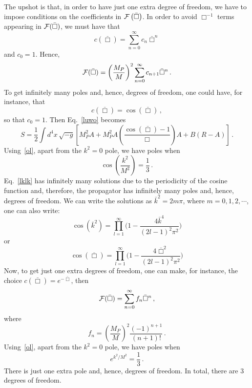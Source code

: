 \documentclass[a4paper,12pt]{article}
\newcommand{\bbox}{\bar{\Box}}
\newcommand{\be}{\begin{equation}}
\newcommand{\ee}{\end{equation}}
\newcommand{\cF}{{\cal F}}
\newcommand{\+}{^{\dagger}}
\newcommand{\LF}{\left(}
\newcommand{\RF}{\right)}
\newcommand{\LT}{\left[}
\newcommand{\RT}{\right]}
\newcommand{\2}{\frac{1}{2}}
\newcommand{\3}{\frac{1}{3}}
\newcommand{\4}{\frac{1}{4}}
\newcommand{\6}{\frac{1}{6}}
\newcommand{\8}{\frac{1}{8}}
\begin{document}
The upshot is that, in order to have just one extra degree of freedom, we have to impose conditions on the coefficients in $\cF \LF \bbox \RF$. In order to avoid $\Box^{-1}$ terms appearing in $\cF{(\bar{\Box})}$, we must have that
\be
c(\bar{\Box})=\sum_{n=0}^{\infty}c_{n}\bar{\Box}^{n} 
\ee
and $c_{0}=1$. Hence,
\be
\cF(\bar{\Box})=\LF \frac{M_{P}}{M} \RF^{2}\sum_{n=0}^{\infty}c_{n+1}\bar{\Box}^{n} \,.
\ee
To get infinitely many poles and, hence, degrees of freedom, one could have, for instance, that
\be
c(\bar{\Box})= \cos (\bar{\Box}) \,,
\ee
so that $c_{0}=1$. Then Eq.~\eqref{luwo} becomes
\be 
S=\frac{1}{2} \int d^{4}x \, \sqrt{-g} \LT M_{P}^{2}A +M_{P}^{2}A\left(\frac{\cos (\bar{\Box})-1}{\Box}\right)A +B(R-A)\RT \,.
\ee
Using~\eqref{ol}, apart from the $k^2=0$ pole,  we have poles when
\be \label{lklk}
\cos \left(\frac{k^{2}}{M^2}\right)=\frac{1}{3}\,.
\ee 
Eq.~\eqref{lklk} has infinitely many solutions due to the periodicity of the cosine function and, therefore, the propagator has infinitely many poles and, hence, degrees of freedom.
We can
write
the solutions as $\bar{k}^{2}=2m\pi$, where $m=0,1,2,\cdots$, one can also
write: 
\begin{equation}
\cos(\bar{k}^{2})=\prod^{\infty}_{l=1}\Bigg(1-\frac{4\bar{k}^{4}}{(2l-1)^{2}\pi^{2}}\Bigg)
\end{equation}
or 
\begin{equation}
\cos(\bbox)=\prod^{\infty}_{l=1}\Bigg(1-\frac{4\bbox^{2}}{(2l-1)^{2}\pi^{2}}\Bigg)
\end{equation}
%
Now, to get just one extra degrees of freedom, one can make, for instance, the choice $c(\bar{\Box})=e^{-\bar{\Box}}$, then
\be
\cF(\bar{\Box})=\sum_{n=0}^{\infty}f_{n}\bar{\Box}^{n} \,,
\ee
where
\be
f_{n}=\LF \frac{M_P}{M} \RF^{2}\frac{(-1)^{n+1}}{(n+1)!} \,.
\ee
Using~\eqref{ol}, apart from the $k^2=0$ pole, we have poles when
\be \label{toko}
e^{k^{2}/M^{2}}=\frac{1}{3}\,.
\ee
There is just one extra pole and, hence, degrees of freedom. In total, there are $3$ degrees of freedom.







\end{document}
